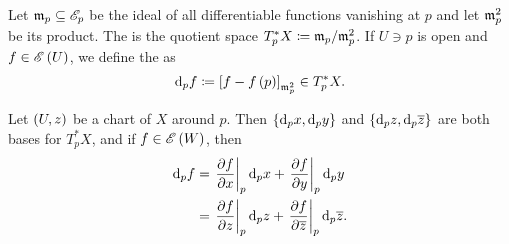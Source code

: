 \documentclass[../Moduli_Spaces_of_Riemann_Surfaces.tex]{subfiles}
\begin{document}
    \begin{definition}
        Let $\mathfrak{m}_p\subseteq\mathscr{E}_p$ be the ideal of all differentiable functions vanishing at $p$ and let $\mathfrak{m}_p^2$ be its product. The  is the quotient space $T_p^\ast X\coloneqq\mathfrak{m}_p/\mathfrak{m}^2_p$. If $U\ni p$ is open and $f\in\mathscr{E}\left(U\right)$, we define the  as
        \begin{equation*}
            \mathrm{d}_pf\coloneqq\left[f-f\left(p\right)\right]_{\mathfrak{m}_p^2}\in T_p^\ast X.
        \end{equation*}
    \end{definition}
    \begin{proposition}
        Let $\left(U,z\right)$ be a chart of $X$ around $p$. Then $\left\{\mathrm{d}_px,\mathrm{d}_py\right\}$ and $\left\{\mathrm{d}_pz,\mathrm{d}_p\overline{z}\right\}$ are both bases for $T_p^\ast X$, and if $f\in\mathscr{E}\left(W\right)$, then
        \begin{equation*}
            \begin{aligned}
                \mathrm{d}_pf&=\left.\frac{\partial f}{\partial x}\right|_p\mathrm{d}_px+\left.\frac{\partial f}{\partial y}\right|_p\mathrm{d}_py \\
                     &=\left.\frac{\partial f}{\partial z}\right|_p\mathrm{d}_pz+\left.\frac{\partial f}{\partial\overline{z}}\right|_p\mathrm{d}_p\overline{z}.
            \end{aligned}
        \end{equation*}
    \end{proposition}
\end{document}
